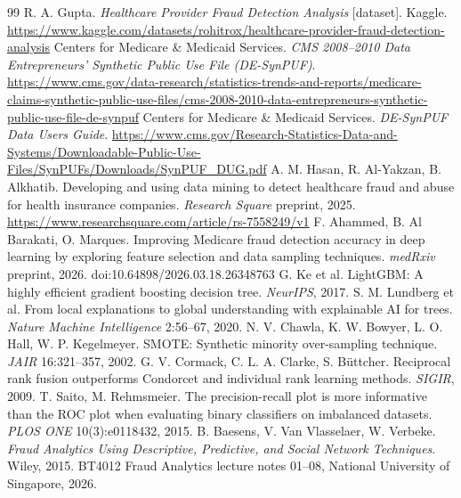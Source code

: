 \documentclass[11pt,a4paper]{article}
\begin{document}
\begin{thebibliography}{99}\small\setlength{\itemsep}{1pt}
 R. A. Gupta. \emph{Healthcare Provider Fraud Detection Analysis} [dataset]. Kaggle. \url{https://www.kaggle.com/datasets/rohitrox/healthcare-provider-fraud-detection-analysis}
 Centers for Medicare \& Medicaid Services. \emph{CMS 2008--2010 Data Entrepreneurs' Synthetic Public Use File (DE-SynPUF)}. \url{https://www.cms.gov/data-research/statistics-trends-and-reports/medicare-claims-synthetic-public-use-files/cms-2008-2010-data-entrepreneurs-synthetic-public-use-file-de-synpuf}
 Centers for Medicare \& Medicaid Services. \emph{DE-SynPUF Data Users Guide}. \url{https://www.cms.gov/Research-Statistics-Data-and-Systems/Downloadable-Public-Use-Files/SynPUFs/Downloads/SynPUF_DUG.pdf}
 A. M. Hasan, R. Al-Yakzan, B. Alkhatib. Developing and using data mining to detect healthcare fraud and abuse for health insurance companies. \emph{Research Square} preprint, 2025. \url{https://www.researchsquare.com/article/rs-7558249/v1}
 F. Ahammed, B. Al Barakati, O. Marques. Improving Medicare fraud detection accuracy in deep learning by exploring feature selection and data sampling techniques. \emph{medRxiv} preprint, 2026. doi:10.64898/2026.03.18.26348763
 G. Ke et al. LightGBM: A highly efficient gradient boosting decision tree. \emph{NeurIPS}, 2017.
 S. M. Lundberg et al. From local explanations to global understanding with explainable AI for trees. \emph{Nature Machine Intelligence} 2:56--67, 2020.
 N. V. Chawla, K. W. Bowyer, L. O. Hall, W. P. Kegelmeyer. SMOTE: Synthetic minority over-sampling technique. \emph{JAIR} 16:321--357, 2002.
 G. V. Cormack, C. L. A. Clarke, S. B\"uttcher. Reciprocal rank fusion outperforms Condorcet and individual rank learning methods. \emph{SIGIR}, 2009.
 T. Saito, M. Rehmsmeier. The precision-recall plot is more informative than the ROC plot when evaluating binary classifiers on imbalanced datasets. \emph{PLOS ONE} 10(3):e0118432, 2015.
 B. Baesens, V. Van Vlasselaer, W. Verbeke. \emph{Fraud Analytics Using Descriptive, Predictive, and Social Network Techniques}. Wiley, 2015.
 BT4012 Fraud Analytics lecture notes 01--08, National University of Singapore, 2026.
\end{thebibliography}

\appendix
\end{document}
